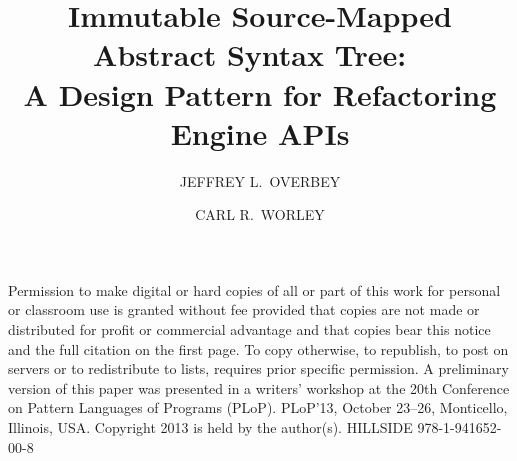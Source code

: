 \documentclass[prodmode]{acmlarge}
\title{Immutable Source-Mapped Abstract Syntax Tree:\ \, \\
 A Design Pattern for Refactoring Engine APIs} %
\author{JEFFREY L.\ OVERBEY \and CARL R.\ WORLEY \affil{Auburn University}}
\begin{document}
\begin{bottomstuff}
Permission to make digital or hard copies of all or part of this work for
personal or classroom use is granted without fee provided that copies are not
made or distributed for profit or commercial advantage and that copies bear
this notice and the full citation on the first page. To copy otherwise, to
republish, to post on servers or to redistribute to lists, requires prior
specific permission. A preliminary version of this paper was presented in a
writers' workshop at the 20th Conference on Pattern Languages of Programs
(PLoP).  PLoP'13, October 23--26, Monticello, Illinois, USA. Copyright 2013 is
held by the author(s). HILLSIDE 978-1-941652-00-8
\end{bottomstuff}


\maketitle
\end{document}

